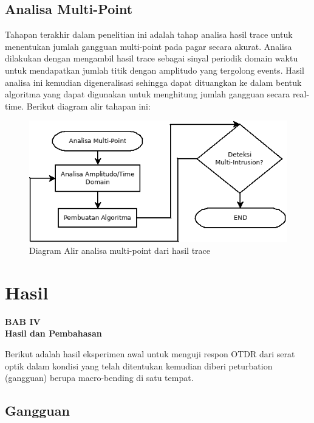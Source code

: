 \documentclass[12pt]{article}
\begin{document}
	\subsection{Analisa Multi-Point}
	
	Tahapan terakhir dalam penelitian ini adalah tahap analisa hasil trace untuk menentukan jumlah gangguan multi-point pada pagar secara akurat.
	Analisa dilakukan dengan mengambil hasil trace sebagai sinyal periodik domain waktu untuk mendapatkan jumlah titik dengan amplitudo yang tergolong events.
	Hasil analisa ini kemudian digeneralisasi sehingga dapat dituangkan ke dalam bentuk algoritma yang dapat digunakan untuk menghitung jumlah gangguan secara real-time.
	Berikut diagram alir tahapan ini:
	
	\begin{figure}[h!]
		\centering
		\captionsetup{justification=centering}
		\includegraphics[width=0.8\linewidth]{images/Bab_3/Bab_3_8}
		\caption[Diagram Alir]{\small{Diagram Alir analisa multi-point dari hasil trace}}
	\end{figure}
	
\newpage

	\setcounter{figure}{0}
	
	\section{Hasil}
	
	\begin{center}
		{\large \textbf{BAB IV}} \\
		{\large \textbf{Hasil dan Pembahasan}}
	\end{center}

	Berikut adalah hasil eksperimen awal untuk menguji respon OTDR dari serat optik dalam kondisi yang telah ditentukan kemudian diberi peturbation (gangguan) berupa macro-bending di satu tempat.
	
	\subsection{Gangguan}
	
\end{document}
